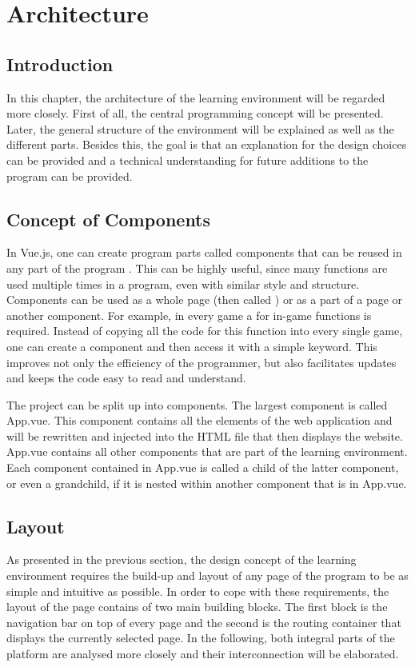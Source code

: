 \chapter{Architecture}
\label{chapter:architecture}

\section{Introduction}
\label{section:introduction}
In this chapter, the architecture of the learning environment will be regarded more closely. First of all, the central programming concept will be presented. Later, the general structure of the environment will be explained as well as the different parts.  Besides this, the goal is that an explanation for the design choices can be provided and a technical understanding for future additions to the program can be provided.

\section{Concept of Components}
\label{section:components}

In Vue.js, one can create program parts called components that can be reused in any part of the program \cite{Vue}. This can be highly useful, since many functions are used multiple times in a program, even with similar style and structure. Components can be used as a whole page (then called ) or as a part of a page or another component. For example, in every game a  for in-game functions is required. Instead of copying all the code for this function into every single game, one can create a component and then access it with a simple keyword. This improves not only the efficiency of the programmer, but also facilitates updates and keeps the code easy to read and understand. 

The project can be split up into components. The largest component is called App.vue. This component contains all the elements of the web application and will be rewritten and injected into the HTML file that then displays the website. App.vue contains all other components that are part of the learning environment. Each component contained in App.vue is called a child of the latter component, or even a grandchild, if it is nested within another component that is in App.vue.


\section{Layout}
\label{section:layout}
As presented in the previous section, the design concept of the learning environment requires the build-up and layout of any page of the program to be as simple and intuitive as possible. In order to cope with these requirements, the layout of the page contains of two main building blocks. The first block is the navigation bar on top of every page and the second is the routing container that displays the currently selected page. In the following, both integral parts of the platform are analysed more closely and their interconnection will be elaborated.


